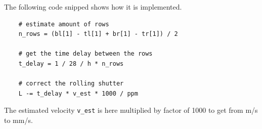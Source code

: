 The following code snipped shows how it is implemented.
\begin{lstlisting}
	# estimate amount of rows
	n_rows = (bl[1] - tl[1] + br[1] - tr[1]) / 2

	# get the time delay between the rows
	t_delay = 1 / 28 / h * n_rows

	# correct the rolling shutter
	L -= t_delay * v_est * 1000 / ppm
\end{lstlisting} 
The estimated velocity \texttt{v\_est} is here multiplied by factor of 1000 to get from m/s to mm/s.


